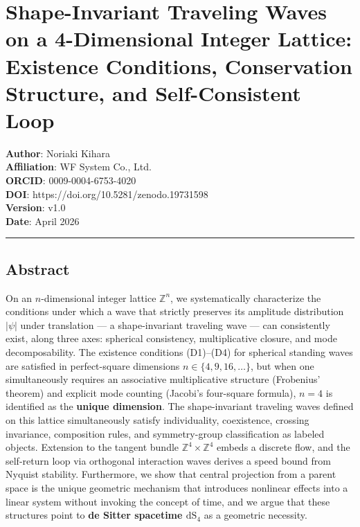 \documentclass[
  a4paper,11pt]{article}
\theoremstyle{definition}
\theoremstyle{remark}
\begin{document}
\section{Shape-Invariant Traveling Waves on a 4-Dimensional Integer
Lattice: Existence Conditions, Conservation Structure, and
Self-Consistent
Loop}\label{shape-invariant-traveling-waves-on-a-4-dimensional-integer-lattice-existence-conditions-conservation-structure-and-self-consistent-loop}

\textbf{Author}: Noriaki Kihara\\
\textbf{Affiliation}: WF System Co., Ltd.\\
\textbf{ORCID}: 0009-0004-6753-4020\\
\textbf{DOI}: https://doi.org/10.5281/zenodo.19731598\\
\textbf{Version}: v1.0\\
\textbf{Date}: April 2026

\begin{center}\rule{0.5\linewidth}{0.5pt}\end{center}

\subsection{Abstract}\label{abstract}

On an \(n\)-dimensional integer lattice \(\mathbb{Z}^n\), we
systematically characterize the conditions under which a wave that
strictly preserves its amplitude distribution \(|\psi|\) under
translation --- a shape-invariant traveling wave --- can consistently
exist, along three axes: spherical consistency, multiplicative closure,
and mode decomposability. The existence conditions (D1)--(D4) for
spherical standing waves are satisfied in perfect-square dimensions
\(n \in \{4, 9, 16, \ldots\}\), but when one simultaneously requires an
associative multiplicative structure (Frobenius' theorem) and explicit
mode counting (Jacobi's four-square formula), \(n = 4\) is identified as
the \textbf{unique dimension}. The shape-invariant traveling waves
defined on this lattice simultaneously satisfy individuality,
coexistence, crossing invariance, composition rules, and symmetry-group
classification as labeled objects. Extension to the tangent bundle
\(\mathbb{Z}^4 \times \mathbb{Z}^4\) embeds a discrete flow, and the
self-return loop via orthogonal interaction waves derives a speed bound
from Nyquist stability. Furthermore, we show that central projection
from a parent space is the unique geometric mechanism that introduces
nonlinear effects into a linear system without invoking the concept of
time, and we argue that these structures point to \textbf{de Sitter
spacetime \(\mathrm{dS}_4\)} as a geometric necessity.
\end{document}
